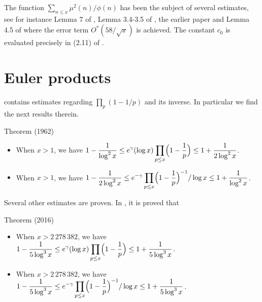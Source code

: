 The function $\sum_{n\le x}\mu^2(n)/\phi(n)$ has been the subject of
several estimates,
see for instance Lemma 7 of
\cite{Montgomery-Vaughan*73},
Lemma 3.4-3.5 of
\cite{Ramare*95},
the earlier paper
\cite{Ward*27}
and Lemma 4.5 of
\cite{Buethe*14}
where the error term $O^*(58/\sqrt{x})$ is achieved.
The constant $c_0$ is evaluated precisely in (2.11) of
\cite{Rosser-Schoenfeld*62}.



\section{Euler products}



\cite{Rosser-Schoenfeld*62}
contains estimates regarding $\prod_{p}(1-1/p)$ and its inverse. In
particular we find the next results therein.
\par 
\begin{thm}{Theorem (1962)}

  \begin{itemize}
    \item When $x > 1$, we have $\displaystyle 1-\frac{1}{\log^2x}\le
      e^\gamma(\log x)\prod_{p\le x}\Bigl(1-\frac{1}{p}\Bigr)\le
      1+\frac{1}{2\log^2x}$.
    

    \item When $x > 1$, we have $\displaystyle 1-\frac{1}{2\log^2x}\le
      e^{-\gamma}\prod_{p\le x}\Bigl(1-\frac{1}{p}\Bigr)^{-1}/\log x\le
      1+\frac{1}{\log^2x}$.
    

    \end{itemize}
\end{thm}

Several other estimates are proven. In
\cite{Dusart*16}, it is
proved that
\par 
\begin{thm}{Theorem (2016)}

  \begin{itemize}
    \item When $x > 2\,278\,382$, we have $\displaystyle 1-\frac{1}{5\log^3x}\le
      e^\gamma(\log x)\prod_{p\le x}\Bigl(1-\frac{1}{p}\Bigr)\le
      1+\frac{1}{5\log^3x}$.
    

    \item When $x > 2\,278\,382$, we have $\displaystyle 1-\frac{1}{5\log^3x}\le
      e^{-\gamma}\prod_{p\le x}\Bigl(1-\frac{1}{p}\Bigr)^{-1}/\log x\le
      1+\frac{1}{5\log^3x}$.
    

    \end{itemize}
\end{thm}


